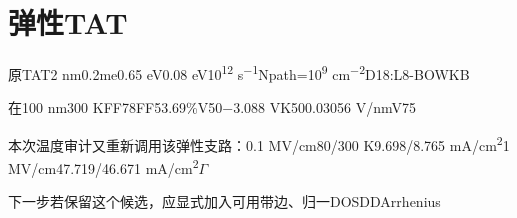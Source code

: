 \section{{\cjkfont 弹性}\allowbreak{}TAT\allowbreak{}}\label{sec:33}
{\cjkfont 原}\allowbreak{}TAT\allowbreak{}2 nm\allowbreak{}0.2me\allowbreak{}0.65 eV\allowbreak{}0.08 eV\allowbreak{}10\textsuperscript{12} s\textsuperscript{−1}\allowbreak{}Npath=\allowbreak{}10\textsuperscript{9} cm\textsuperscript{−2}\allowbreak{}D18:L8-BO\allowbreak{}WKB\allowbreak{}
\par
{\cjkfont 在}\allowbreak{}100 nm\allowbreak{}300 K\allowbreak{}FF78\allowbreak{}FF\allowbreak{}53.69\%\allowbreak{}V50\allowbreak{}−3.088 V\allowbreak{}K50\allowbreak{}0.03056 V/nm\allowbreak{}V75\allowbreak{}
\par
{\cjkfont 本次温度审计又重新调用该弹性支路：}\allowbreak{}0.1 MV/cm\allowbreak{}80/300 K\allowbreak{}9.698/8.765 mA/cm\textsuperscript{2}\allowbreak{}1 MV/cm\allowbreak{}47.719/46.671 mA/cm\textsuperscript{2}\allowbreak{}\ensuremath{\Gamma}\allowbreak{}
\par
{\cjkfont 下一步若保留这个候选，应显式加入可用带边、归一}\allowbreak{}DOS\allowbreak{}DD\allowbreak{}Arrhenius\allowbreak{}
